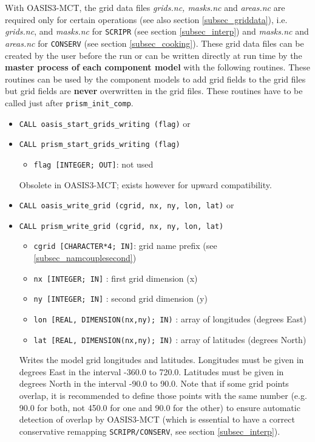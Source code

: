 With OASIS3-MCT, the grid data files {\em grids.nc, masks.nc} and {\em
  areas.nc} are required only for certain operations (see also
section \ref{subsec_griddata}), i.e.  {\em grids.nc}, and {\em
  masks.nc} for {\tt SCRIPR} (see section
\ref{subsec_interp}) and {\em masks.nc} and {\em areas.nc} 
for {\tt CONSERV} (see section \ref{subsec_cooking}). These grid data files can be
created by the user before the run or can be written directly at run
time by the {\bf master process of each component model} with the following
routines.  These routines can be used by the component models to add
grid fields to the grid files but grid fields
are {\bf never} overwritten in the grid files. These routines have to
be called just after {\tt prism\_init\_comp}.

\begin{itemize}

\item {\tt CALL  oasis\_start\_grids\_writing (flag)} or
\item {\tt CALL  prism\_start\_grids\_writing (flag)}
\begin{itemize}
    \item {\tt flag [INTEGER; OUT]}:  not used
  \end{itemize}
  Obsolete in OASIS3-MCT; exists however for upward compatibility.

\vspace{0.2cm}
\item {\tt CALL oasis\_write\_grid (cgrid, nx, ny, lon, lat)} or
\item {\tt CALL prism\_write\_grid (cgrid, nx, ny, lon, lat)}
        
 \begin{itemize}
    \item {\tt cgrid [CHARACTER*4; IN]}: grid name prefix (see
    \ref{subsec_namcouplesecond})
    \item {\tt nx [INTEGER; IN]} : first grid dimension (x)
    \item {\tt ny [INTEGER; IN]} : second grid dimension (y)
    \item {\tt lon [REAL, DIMENSION(nx,ny); IN)} : array of longitudes
      (degrees East) 
    \item {\tt lat [REAL, DIMENSION(nx,ny); IN)} : array of latitudes
    (degrees North)
 \end{itemize}

 Writes the model grid longitudes and latitudes. Longitudes must
 be given in degrees East in the interval -360.0 to 720.0. Latitudes
 must be given in degrees North in the interval -90.0 to 90.0. Note
 that if some grid points overlap, it is recommended to define those
 points with the same number (e.g. 90.0 for both, not 450.0 for one
 and 90.0 for the other) to ensure automatic detection of overlap by OASIS3-MCT
 (which is essential to have a correct conservative remapping
 \texttt{SCRIPR/CONSERV}, see section \ref{subsec_interp}). 


\end{itemize}
